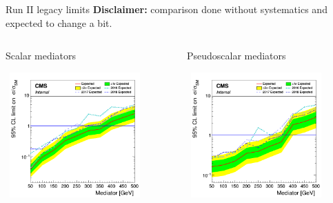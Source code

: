 \documentclass[8pt]{beamer}
\begin{document}
\begin{frame}{Run II legacy limits}
\textbf{Disclaimer:} comparison done without systematics and expected to change a bit. \vfill

\begin{columns}
	\begin{column}{0.5 \textwidth}
\begin{center}
\begin{block}{\centering Scalar mediators}\end{block} \vspace{-10pt}
\includegraphics[width=5.4cm, height=4.8cm]{figs/limit_scalar_allYears.png}
\end{center}
\end{column}
	\begin{column}{0.5 \textwidth}
\begin{figure}[htbp]
\begin{center}
\begin{block}{\centering Pseudoscalar mediators}\end{block} \vspace{-8pt}
\includegraphics[width=5.4cm, height=4.8cm]{figs/limit_pseudo_allYears.png}
\end{center}
\end{figure}
	\end{column}
	\end{columns} \vfill
\end{frame}
\end{document}
